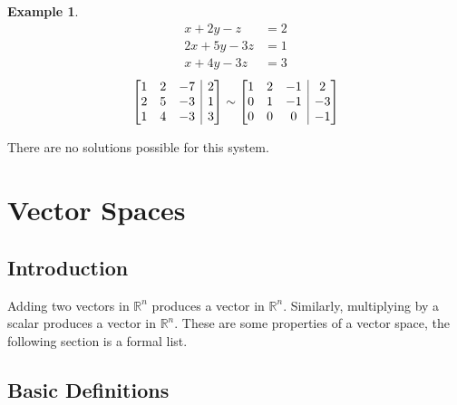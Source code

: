 \documentclass{report}
\makeatletter
\newenvironment{amatrix}[1]{%
  \left[\begin{array}{@{}*{#1}{c}|c@{}}
}{%
  \end{array}\right]
}
\theoremstyle{definition}
\newtheorem{ex}{Example}
\makeatother
\begin{document}
\begin{ex}
\begin{align*}
x+2y-z&=2 \\
2x+5y-3z&=1 \\
x+4y-3z&=3
\end{align*}
\[\begin{amatrix}{3}
 1 & 2 & -7 & 2 \\
 2 & 5 & -3 & 1 \\
 1 & 4 & -3 & 3
\end{amatrix}\sim
\begin{amatrix}{3}
 1 & 2 & -1 & 2 \\
 0 & 1 & -1 & -3 \\
 0 & 0 & 0 & -1
\end{amatrix}
\]

There are no solutions possible for this system.
\end{ex}

\chapter{Vector Spaces}

\section{Introduction}

Adding two vectors in $\mathbb{R}^n$ produces a vector in $\mathbb{R}^n$.
Similarly, multiplying by a scalar produces a vector in $\mathbb{R}^n$.
These are some properties of a vector space, the following section is a formal list.

\section{Basic Definitions}
\end{document}
